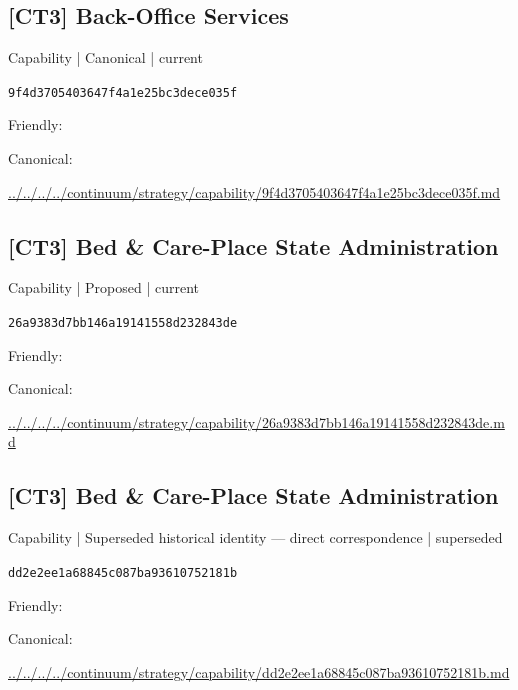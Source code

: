 \documentclass[10pt,a4paper]{article}
\begin{document}
\subsection*{[CT3] Back-Office Services}
{\small Capability | Canonical | current}\par
\texttt{9f4d3705403647f4a1e25bc3dece035f}\par
Friendly: \par
Canonical: \par
{\footnotesize\url{../../../../continuum/strategy/capability/9f4d3705403647f4a1e25bc3dece035f.md}}\par
\subsection*{[CT3] Bed \& Care-Place State Administration}
{\small Capability | Proposed | current}\par
\texttt{26a9383d7bb146a19141558d232843de}\par
Friendly: \par
Canonical: \par
{\footnotesize\url{../../../../continuum/strategy/capability/26a9383d7bb146a19141558d232843de.md}}\par
\subsection*{[CT3] Bed \& Care-Place State Administration}
{\small Capability | Superseded historical identity — direct correspondence | superseded}\par
\texttt{dd2e2ee1a68845c087ba93610752181b}\par
Friendly: \par
Canonical: \par
{\footnotesize\url{../../../../continuum/strategy/capability/dd2e2ee1a68845c087ba93610752181b.md}}\par
\end{document}
